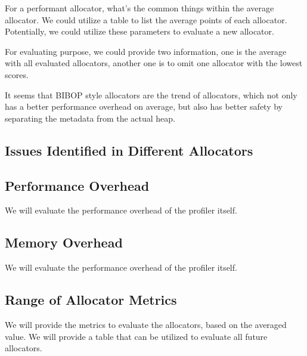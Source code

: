 


For a performant allocator, what's the common things within the average allocator. We could utilize a table to list the average points of each allocator. Potentially, we could utilize these parameters to evaluate a new allocator. 

For evaluating purpose, we could provide two information, one is the average with all evaluated allocators, another one is to omit one allocator with the lowest scores. 


It seems that BIBOP style allocators are the trend of allocators, which not only has a better performance overhead on average, but also has better safety by separating the metadata from the actual heap. 

\subsection{Issues Identified in Different Allocators}

 

\subsection{Performance Overhead}
\label{sec:perf}

We will evaluate the performance overhead of the profiler itself. 

\subsection{Memory Overhead}
\label{sec:memory}

We will evaluate the performance overhead of the profiler itself. 

\subsection{Range of Allocator Metrics}
We will provide the metrics to evaluate the allocators, based on the averaged value. 
We will provide a table that can be utilized to evaluate all future allocators. 

